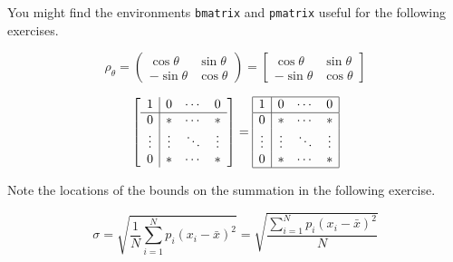 \documentclass{article}
\begin{document}
\setcounter{equation}{20}

You might find the environments \texttt{bmatrix} and \texttt{pmatrix} useful for the following exercises.

\begin{equation}
    \rho_\theta =
    \begin{pmatrix}
    \cos\theta & \sin\theta \\
    -\sin\theta & \cos\theta
    \end{pmatrix}
    =
    \begin{bmatrix}
    \cos\theta & \sin\theta \\
    -\sin\theta & \cos\theta
    \end{bmatrix}
\end{equation}

\begin{equation}
    \left[
    \begin{array}{c|ccc}
    1 & 0 & \cdots & 0 \\
    \hline
    0 & * & \cdots & * \\
    \vdots & \vdots & \ddots & \vdots \\
    0 & * & \cdots & *
    \end{array}
    \right]
    =
    \begin{array}{|c|ccc|}
    \hline
    1 & 0 & \cdots & 0 \\ \hline
    0 & * & \cdots & * \\ 
    \vdots & \vdots & \ddots & \vdots \\ 
    0 & * & \cdots & * \\ \hline
    \end{array}
\end{equation}

Note the locations of the bounds on the summation in the following exercise.

\begin{equation}
    \sigma = \sqrt{ \frac{1}{N} \sum_{i=1}^{N} p_i (x_i - \bar{x})^2 }
    = \sqrt{ \frac{ \sum\limits_{i=1}^{N} p_i (x_i - \bar{x})^2 }{N} }
\end{equation}
\end{document}
